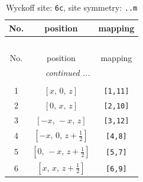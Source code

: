 \documentclass[fleqn,8pt]{jsarticle}
\begin{document}
\renewcommand{\arraystretch}{1.2}
\begin{longtable}{ccc}
\caption{Wyckoff site: {\tt 6c}, site symmetry: {\tt ..m}}
 \\
 \hline \hline
No. & position & mapping \\ \hline \endfirsthead

\multicolumn{2}{l}{\tablename\ \thetable{}} \\
 \hline \hline
No. & position & mapping \\ \hline \endhead

 \hline \hline
\multicolumn{2}{r}{\footnotesize\it continued ...} \\ \endfoot

 \hline \hline
\multicolumn{2}{r}{} \\ \endlastfoot

1 & $\left[ x,\, 0,\, z \right]$ & {\tt [1,11]} \\ \hline
2 & $\left[ 0,\, x,\, z \right]$ & {\tt [2,10]} \\ \hline
3 & $\left[ - x,\, - x,\, z \right]$ & {\tt [3,12]} \\ \hline
4 & $\left[ - x,\, 0,\, z + \frac{1}{2} \right]$ & {\tt [4,8]} \\ \hline
5 & $\left[ 0,\, - x,\, z + \frac{1}{2} \right]$ & {\tt [5,7]} \\ \hline
6 & $\left[ x,\, x,\, z + \frac{1}{2} \right]$ & {\tt [6,9]} \\
\end{longtable}
\renewcommand{\arraystretch}{1.2}
\end{document}
